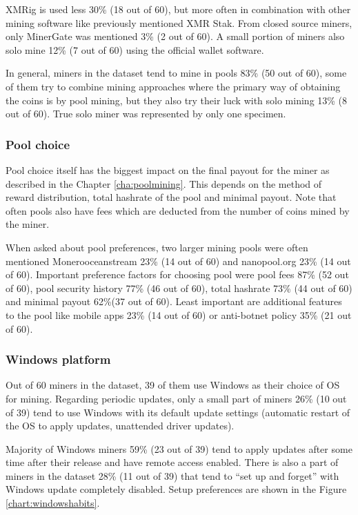 \documentclass[
  printed, %
  table,   %
  lof,     %
  lot,     %
           oneside, color
]{fithesis3}
\begin{document}
\vspace{-2em}
XMRig is used less 30\% (18 out of 60), but more often in combination with other mining software like previously mentioned XMR Stak. From closed source miners, only MinerGate was mentioned 3\% (2 out of 60). A small portion of miners also solo mine 12\% (7 out of 60) using the official wallet software. 
 
In general, miners in the dataset tend to mine in pools 83\% (50 out of 60), some of them try to combine mining approaches where the primary way of obtaining the coins is by pool mining, but they also try their luck with solo mining 13\% (8 out of 60). True solo miner was represented by only one specimen. 

\subsubsection{Pool choice}
Pool choice itself has the biggest impact on the final payout for the miner as described in the Chapter \ref{cha:poolmining}. This depends on the method of reward distribution, total hashrate of the pool and minimal payout. Note that often pools also have fees which are deducted from the number of coins mined by the miner.

When asked about pool preferences, two larger mining pools were often mentioned Monerooceanstream 23\% (14 out of 60) and nanopool.org 23\% (14 out of 60). Important preference factors for choosing pool were pool fees 87\% (52 out of 60), pool security history 77\% (46 out of 60), total hashrate 73\% (44 out of 60) and minimal payout 62\%(37 out of 60). Least important are additional features to the pool like mobile apps 23\% (14 out of 60) or anti-botnet policy 35\% (21 out of 60).
\subsubsection{Windows platform}
Out of 60 miners in the dataset, 39 of them use Windows as their choice of OS for mining. Regarding periodic updates, only a small part of miners 26\% (10 out of 39) tend to use Windows with its default update settings (automatic restart of the OS to apply updates, unattended driver updates). 

Majority of Windows miners 59\% (23 out of 39) tend to apply updates after some time after their release and have remote access enabled. There is also a part of miners in the dataset 28\% (11 out of 39) that tend to \enquote{set up and forget} with Windows update completely disabled. Setup preferences are shown in the Figure \ref{chart:windowshabits}.
\end{document}

